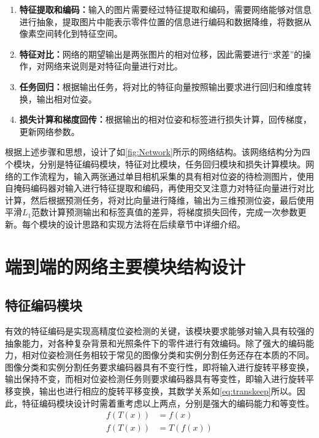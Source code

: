 \documentclass{Diploma}
\begin{document}
\begin{enumerate}
  \item \textbf{特征提取和编码：}输入的图片需要经过特征提取和编码，需要网络能够对信息进行抽象，提取图片中能表示零件位置的信息进行编码和数据降维，将数据从像素空间转化到特征空间。
  \item \textbf{特征对比：}网络的期望输出是两张图片的相对位移，因此需要进行“求差”的操作，对网络来说则是对特征向量进行对比。
  \item \textbf{任务回归：}根据输出任务，将对比的特征向量按照输出要求进行回归和维度转换，输出相对位姿。
  \item \textbf{损失计算和梯度回传：}根据输出的相对位姿和标签进行损失计算，回传梯度，更新网络参数。
\end{enumerate}

根据上述步骤和思想，设计了如\ref{fig:Network}所示的网络结构。该网络结构分为四个模块，分别是特征编码模块，特征对比模块，任务回归模块和损失计算模块。网络的工作流程为，输入两张通过单目相机采集的具有相对位姿的待检测图片，使用自掩码编码器对输入进行特征提取和编码，再使用交叉注意力对特征向量进行对比计算，然后根据预测任务，将对比向量进行降维，输出为三维预测位姿，最后使用平滑$L_{1}$范数计算预测输出和标签真值的差异，将梯度损失回传，完成一次参数更新。每个模块的设计思路和实现方法将在后续章节中详细介绍。
%

\section{端到端的网络主要模块结构设计}
\subsection{特征编码模块}
有效的特征编码是实现高精度位姿检测的关键，该模块要求能够对输入具有较强的抽象能力，对各种复杂背景和光照条件下的零件进行有效编码。除了强大的编码能力，相对位姿检测任务相较于常见的图像分类和实例分割任务还存在本质的不同。图像分类和实例分割任务要求编码器具有不变行性，即将输入进行旋转平移变换，输出保持不变，而相对位姿检测任务则要求编码器具有等变性，即输入进行旋转平移变换，输出也进行相应的旋转平移变换，其数学关系如\eqref{eq:transkeep}所以。因此，特征编码模块设计时需着重考虑以上两点，分别是强大的编码能力和等变性。
  \begin{equation} \label{eq:transkeep}
    \begin{aligned}
    f(T(x)) &= f(x) \\
    f(T(x)) &= T(f(x)) 
    \end{aligned}
  \end{equation}
\end{document}
